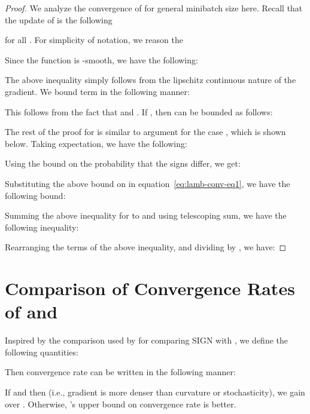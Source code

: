 \documentclass{article} \usepackage{iclr2020_conference,times}
\def\eqref#1{equation~\ref{#1}}
\begin{document}
\begin{proof}
We analyze the convergence of  for general minibatch size here. Recall that the update of   is the following

for all . For simplicity of notation, we reason the 

Since the function  is -smooth, we have the following:

The above inequality simply follows from the lipschitz continuous nature of the gradient. We bound term  in the following manner:

This follows from the fact that  and . If , then  can be bounded as follows:

The rest of the proof for  is similar to argument for the case , which is shown below. Taking expectation, we have the following:

Using the bound on the probability that the signs differ, we get:

Substituting the above bound on  in \eqref{eq:lamb-conv-eq1}, we have the following bound:

Summing the above inequality for  to  and using telescoping sum, we have the following inequality:
 


Rearranging the terms of the above inequality, and dividing by , we have:

\end{proof}


\section{Comparison of Convergence Rates of  and }
\label{sec:conv-compare}

Inspired by the comparison used by \citep{signsgd} for comparing SIGN  with , we define the following quantities:

Then  convergence rate can be written in the following manner:

If  and  then  (i.e., gradient is more denser than curvature or stochasticity), we gain over . Otherwise, 's upper bound on convergence rate is better.
\end{document}
